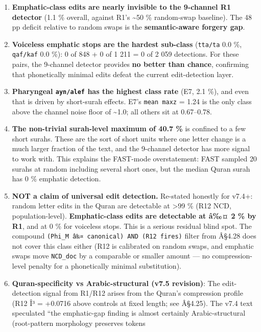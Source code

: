 \documentclass[
]{article}
\begin{document}
\begin{enumerate}
\def\labelenumi{\arabic{enumi}.}
\item
  \textbf{Emphatic-class edits are nearly invisible to the 9-channel R1
  detector} (1.1 \% overall, against R1's \textasciitilde50 \%
  random-swap baseline). The 48 pp deficit relative to random swaps is
  the \textbf{semantic-aware forgery gap}.
\item
  \textbf{Voiceless emphatic stops are the hardest sub-class}
  (\texttt{tta/ta} 0.0 \%, \texttt{qaf/kaf} 0.0 \%): 0 of 848 + 0 of 1
  211 = 0 of 2 059 detections. For these pairs, the 9-channel detector
  provides \textbf{no better than chance}, confirming that phonetically
  minimal edits defeat the current edit-detection layer.
\item
  \textbf{Pharyngeal \texttt{ayn/alef} has the highest class rate} (E7,
  2.1 \%), and even that is driven by short-surah effects. E7's
  \texttt{mean\ max\textbar{}z\textbar{}} = 1.24 is the only class above
  the channel noise floor of \textasciitilde1.0; all others sit at
  0.67--0.78.
\item
  \textbf{The non-trivial surah-level maximum of 40.7 \%} is confined to
  a few short surahs. These are the sort of short units where one letter
  change is a much larger fraction of the text, and the 9-channel
  detector has more signal to work with. This explains the FAST-mode
  overstatement: FAST sampled 20 surahs at random including several
  short ones, but the median Quran surah has 0 \% emphatic detection.
\item
  \textbf{NOT a claim of universal edit detection.} Re-stated honestly
  for v7.4+: random letter edits in the Quran are detectable at
  \textgreater99 \% (R12 NCD, population-level). \textbf{Emphatic-class
  edits are detectable at â‰¤ 2 \% by R1}, and at 0 \% for voiceless
  stops. This is a serious residual blind spot. The compound
  \texttt{(Phi\_M\ â‰¤\ canonical)\ AND\ (R12\ fires)} filter from
  Â§4.28 does not cover this class either (R12 is calibrated on random
  swaps, and emphatic swaps move \texttt{NCD\_doc} by a comparable or
  smaller amount --- no compression-level penalty for a phonetically
  minimal substitution).
\item
  \textbf{Quran-specificity vs Arabic-structural (v7.5 revision)}: The
  edit-detection signal from R1/R12 arises from the Quran's compression
  profile (R12 Î³ = +0.0716 above controls at fixed length; see Â§4.25).
  The v7.4 text speculated ``the emphatic-gap finding is almost
  certainly Arabic-structural (root-pattern morphology preserves tokens

\end{enumerate}
\end{document}
